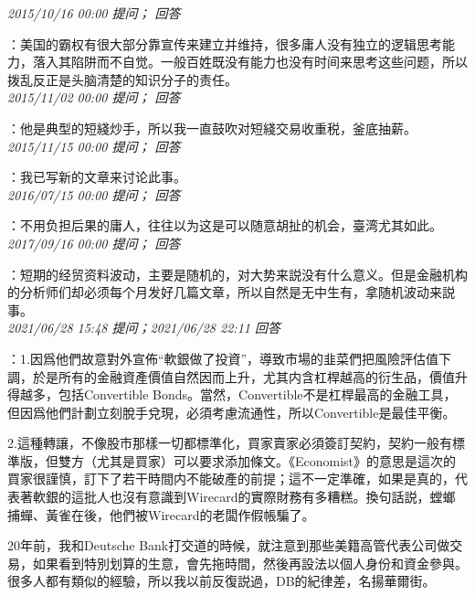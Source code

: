 \documentclass[twocolumn]{ctexart}
\begin{document}
\textit{\hfill\noindent\small 2015/10/16 00:00 提问； 回答}

：美国的霸权有很大部分靠宣传来建立并维持，很多庸人没有独立的逻辑思考能力，落入其陷阱而不自觉。一般百姓既没有能力也没有时间来思考这些问题，所以拨乱反正是头脑清楚的知识分子的责任。\\

\textit{\hfill\noindent\small 2015/11/02 00:00 提问； 回答}

：他是典型的短綫炒手，所以我一直鼓吹对短綫交易收重税，釜底抽薪。\\

\textit{\hfill\noindent\small 2015/11/15 00:00 提问； 回答}

：我已写新的文章来讨论此事。\\

\textit{\hfill\noindent\small 2016/07/15 00:00 提问； 回答}

：不用负担后果的庸人，往往以为这是可以随意胡扯的机会，臺湾尤其如此。\\

\textit{\hfill\noindent\small 2017/09/16 00:00 提问； 回答}

：短期的经贸资料波动，主要是随机的，对大势来説没有什么意义。但是金融机构的分析师们却必须每个月发好几篇文章，所以自然是无中生有，拿随机波动来説事。\\

\textit{\hfill\noindent\small 2021/06/28 15:48 提问；2021/06/28 22:11 回答}

：1.因爲他們故意對外宣佈“軟銀做了投資”，導致市場的韭菜們把風險評估值下調，於是所有的金融資產價值自然因而上升，尤其内含杠桿越高的衍生品，價值升得越多，包括Convertible Bonds。當然，Convertible不是杠桿最高的金融工具，但因爲他們計劃立刻脫手兌現，必須考慮流通性，所以Convertible是最佳平衡。

2.這種轉讓，不像股市那樣一切都標準化，買家賣家必須簽訂契約，契約一般有標準版，但雙方（尤其是買家）可以要求添加條文。《Economist》的意思是這次的買家很謹慎，訂下了若干時間内不能破產的前提；這不一定準確，如果是真的，代表著軟銀的這批人也沒有意識到Wirecard的實際財務有多糟糕。換句話説，螳螂捕蟬、黃雀在後，他們被Wirecard的老闆作假帳騙了。

20年前，我和Deutsche Bank打交道的時候，就注意到那些美籍高管代表公司做交易，如果看到特別划算的生意，會先拖時間，然後再設法以個人身份和資金參與。很多人都有類似的經驗，所以我以前反復説過，DB的紀律差，名揚華爾街。
\\
\end{document}
